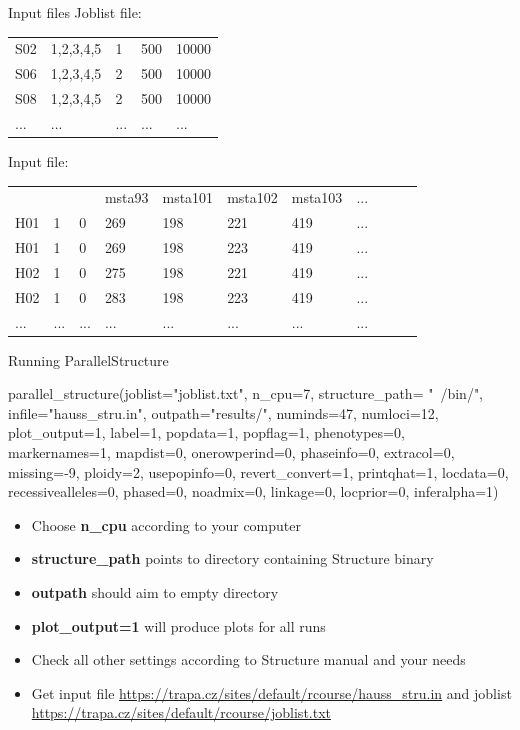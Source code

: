 \documentclass[compress, ucs, xelatex, 11pt, xcolor=svgnames,
  hyperref={
    bookmarks=true,
    unicode=true,
    colorlinks=true,
    pdftitle={Molecular data in R},
    plainpages=false,
    pdfauthor={Vojtech Zeisek},
    pdfsubject={Course about phylogeny and evolution in R},
    pdfcreator={XeLaTeX},
    pdfkeywords={R, evolution, phylogeny, molecular data},
    linkcolor=Tomato,
    anchorcolor=SaddleBrown,
    citecolor=Goldenrod,
    filecolor=DarkMagenta,
    menucolor=Sienna,
    urlcolor=DarkTurquoise,
    pdftex},
  url={hyphens, lowtilde} %
  ]{beamer}
\begin{document}
\begin{frame}[fragile]{Input files}
Joblist file:\\
\vfill
\begin{tabular}{lllll}
S02 & 1,2,3,4,5 & 1 & 500 & 10000\\
S06 & 1,2,3,4,5 & 2 & 500 & 10000\\
S08 & 1,2,3,4,5 & 2 & 500 & 10000\\
... & ... & ... & ... & ...\\
\end{tabular}
\vfill
Input file:\\
\vfill
\begin{tabular}{lllllllllll}
 & & & msta93 & msta101 & msta102 & msta103 & ...\\
H01 & 1 & 0 & 269 & 198 & 221 & 419 & ...\\
H01 & 1 & 0 & 269 & 198 & 223 & 419 & ...\\
H02 & 1 & 0 & 275 & 198 & 221 & 419 & ...\\
H02 & 1 & 0 & 283 & 198 & 223 & 419 & ...\\
... & ... & ... & ... & ... & ... & ... & ...
\end{tabular}
\end{frame}

\begin{frame}[fragile]{Running ParallelStructure}
  \begin{spluscode}
    parallel_structure(joblist="joblist.txt", n_cpu=7, structure_path=
      "~/bin/", infile="hauss_stru.in", outpath="results/", numinds=47,
      numloci=12, plot_output=1, label=1, popdata=1, popflag=1,
      phenotypes=0, markernames=1, mapdist=0, onerowperind=0, phaseinfo=0,
      extracol=0, missing=-9, ploidy=2, usepopinfo=0, revert_convert=1,
      printqhat=1, locdata=0, recessivealleles=0, phased=0, noadmix=0,
      linkage=0, locprior=0, inferalpha=1)
  \end{spluscode}
\begin{itemize}
 \item Choose \textbf{n\_cpu} according to your computer
 \item \textbf{structure\_path} points to \alert{directory} containing Structure binary
 \item \textbf{outpath} should aim to empty directory
 \item \textbf{plot\_output=1} will produce plots for all runs
 \item Check all other settings according to Structure manual and your needs
 \item Get input file \url{https://trapa.cz/sites/default/rcourse/hauss_stru.in} and joblist \url{https://trapa.cz/sites/default/rcourse/joblist.txt}
\end{itemize}
\end{frame}
\end{document}
